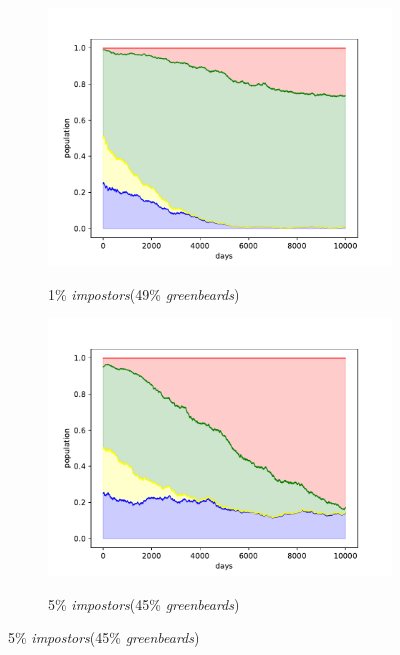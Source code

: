 \documentclass[sigconf]{acmart}
\newcommand{\impostors}{\textit{impostors}\xspace}
\newcommand{\greenbeards}{\textit{greenbeards}\xspace}
\begin{document}
    \begin{figure}
        \begin{subfigure}[b]{0.475\textwidth}
            \centering
            \includegraphics[width=\textwidth]{figures/exp4_impostor_1}
            \label{fig:1_imp}
            \caption{1\% \impostors (49\% \greenbeards)}
        \end{subfigure}
        \hfill
        \begin{subfigure}[b]{0.475\textwidth}
            \centering
            \includegraphics[width=\textwidth]{figures/exp4_impostor_5}
            \label{fig:5_imp}
            \caption{5\% \impostors (45\% \greenbeards)}
        \end{subfigure}

\end{figure}
\end{document}
